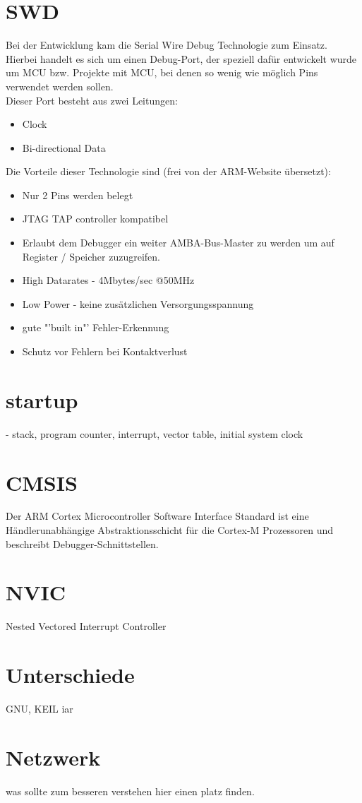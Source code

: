 \chapter{SWD}
Bei der Entwicklung kam die Serial Wire Debug Technologie zum Einsatz. Hierbei 
handelt es sich um einen Debug-Port, der speziell daf\"ur entwickelt wurde um MCU bzw. 
Projekte mit MCU, bei denen so wenig wie m\"oglich Pins verwendet werden sollen. \\
Dieser Port besteht aus zwei Leitungen:\\
\begin{itemize}
\item Clock
\item Bi-directional Data
\end{itemize}
Die Vorteile dieser Technologie sind (frei von der ARM-Website \"ubersetzt):
\begin{itemize}
\item Nur 2 Pins werden belegt
\item JTAG TAP controller kompatibel
\item Erlaubt dem Debugger ein weiter AMBA-Bus-Master zu werden um auf
Register / Speicher zuzugreifen.
\item High Datarates - 4Mbytes/sec @50MHz
\item Low Power - keine zus\"atzlichen Versorgungsspannung
\item gute "'built in"' Fehler-Erkennung
\item Schutz vor Fehlern bei Kontaktverlust
\end{itemize}  

\chapter{startup}
 - stack, program counter, interrupt, vector table, initial system clock

\chapter{CMSIS}
Der ARM Cortex Microcontroller Software Interface Standard ist eine 
H\"andlerunabh\"angige Abstraktionsschicht f\"ur die Cortex-M Prozessoren
 und beschreibt Debugger-Schnittstellen.

\chapter{NVIC}
Nested Vectored Interrupt Controller

\chapter{Unterschiede}
GNU, KEIL iar

\chapter{Netzwerk}
was sollte zum besseren verstehen hier einen platz finden.



